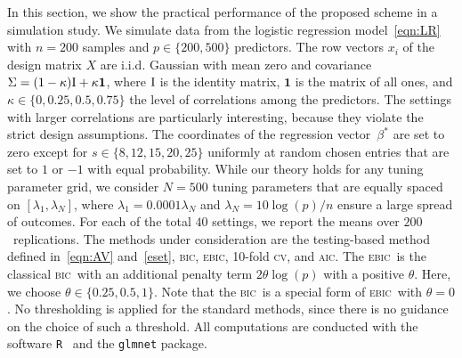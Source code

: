 \documentclass{elsarticle}
\newcommand{\oldnew}{}
\newcommand{\truepara}{{\beta^*}}
\newcommand{\tuning}{{\lambda}}
\def\AIC{\textsc{aic}}
\def\BIC{\textsc{bic}}
\def\EBIC{\textsc{ebic}}
\def\CV{\textsc{cv}}
\begin{document}
In this section, we show the practical performance of the proposed scheme in a simulation study. We simulate data from the logistic regression model~\eqref{eqn:LR} with $n = 200$ samples and $p\in\{200, 500\}$ predictors. The row vectors $x_{i}$ of the design matrix $X$ are i.i.d. Gaussian  with mean zero and covariance $\Sigma = (1-\kappa)\textnormal{I} + \kappa \textbf{1}$, where $\textnormal{I}$ is the identity matrix, $\textbf{1}$ is the matrix of all ones, and $\kappa\in \{0, 0.25, 0.5, 0.75\}$ the level of correlations among the predictors. The settings with larger correlations are particularly interesting, because they violate the strict design assumptions. The coordinates of the regression vector~$\truepara$ are set to zero except for $s\in \{8,12,15{\oldnew , 20, 25}\}$ uniformly at random chosen entries that are set to $1$ or $-1$ with equal probability. While our theory holds for any tuning parameter grid, we consider $N=500$ tuning parameters that are equally spaced on $[\tuning_{1},\tuning_{N}]$, where $\tuning_{1}=0.0001\tuning_{N}$ and $\tuning_{N}=10\log(p)/n$ ensure a large spread of outcomes. For each of the total {\oldnew $40$} settings,  we report the means over  $200$~replications. The methods under consideration are the testing-based method defined in~\eqref{eqn:AV} and~\eqref{eset},  \BIC, {\oldnew \EBIC}, 10-fold \CV, and \AIC. {\oldnew The \EBIC~is the
classical \BIC~with an additional penalty term $2\theta\log(p)$ with a positive $\theta$. Here, we choose $\theta\in\{0.25,0.5,1\}$. Note that the \BIC~is a special form of \EBIC~with $\theta=0$.}
No thresholding is applied for the standard methods, since there is no guidance on the choice of such a threshold. All computations are conducted with the software \texttt{R}~\citep{Rsoftware} and the \texttt{glmnet} package.
\end{document}

